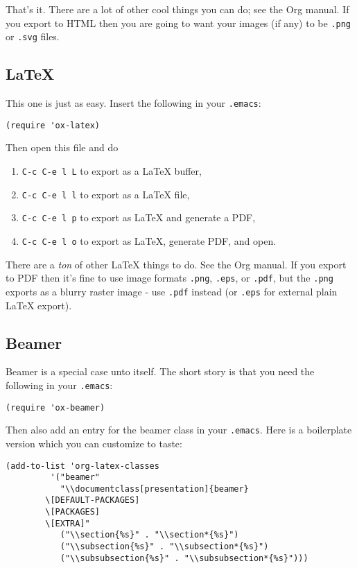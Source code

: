 \documentclass[11pt]{article}
\begin{document}
That's it.  There are a lot of other cool things you can do; see the
Org manual.  If you export to HTML then you are going to want your
images (if any) to be \texttt{.png} or \texttt{.svg} files.
\subsection[\LaTeX{}]{\LaTeX{}}
\label{sec-4-2}

This one is just as easy.  Insert the following in your \texttt{.emacs}:

\begin{verbatim}
(require 'ox-latex)
\end{verbatim}

Then open this file and do

\begin{enumerate}
\item \texttt{C-c C-e l L} to export as a \LaTeX{} buffer,
\item \texttt{C-c C-e l l} to export as a \LaTeX{} file,
\item \texttt{C-c C-e l p} to export as \LaTeX{} and generate a PDF,
\item \texttt{C-c C-e l o} to export as \LaTeX{}, generate PDF, and open.
\end{enumerate}

There are a \emph{ton} of other \LaTeX{} things to do.  See the Org manual.
If you export to PDF then it's fine to use image formats \texttt{.png},
\texttt{.eps}, or \texttt{.pdf}, but the \texttt{.png} exports as a blurry raster image -
use \texttt{.pdf} instead (or \texttt{.eps} for external plain \LaTeX{} export).
\subsection[Beamer]{Beamer}
\label{sec-4-3}

Beamer is a special case unto itself. The short story is that you need
the following in your \texttt{.emacs}:

\begin{verbatim}
(require 'ox-beamer)
\end{verbatim}

Then also add an entry for the beamer class in your \texttt{.emacs}.  Here is
a boilerplate version which you can customize to taste:

\begin{verbatim}
(add-to-list 'org-latex-classes
	     '("beamer"
	       "\\documentclass[presentation]{beamer}
        \[DEFAULT-PACKAGES]
        \[PACKAGES]
        \[EXTRA]"
	       ("\\section{%s}" . "\\section*{%s}")
	       ("\\subsection{%s}" . "\\subsection*{%s}")
	       ("\\subsubsection{%s}" . "\\subsubsection*{%s}")))
\end{verbatim}
\end{document}

